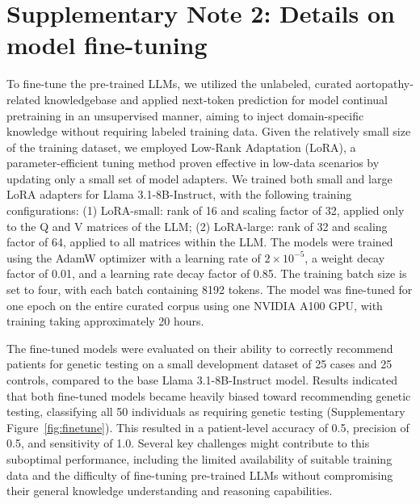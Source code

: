 \documentclass[fleqn,10pt]{wlscirep}
\begin{document}
\section*{Supplementary Note 2: Details on model fine-tuning}
To fine-tune the pre-trained LLMs, we utilized the unlabeled, curated aortopathy-related knowledgebase and applied next-token prediction for model continual pretraining in an unsupervised manner, aiming to inject domain-specific knowledge without requiring labeled training data. Given the relatively small size of the training dataset, we employed Low-Rank Adaptation (LoRA), a parameter-efficient tuning method proven effective in low-data scenarios by updating only a small set of model adapters. We trained both small and large LoRA adapters for Llama 3.1-8B-Instruct, with the following training configurations: (1) LoRA-small: rank of 16 and scaling factor of 32, applied only to the Q and V matrices of the LLM; (2) LoRA-large: rank of 32 and scaling factor of 64, applied to all matrices within the LLM. The models were trained using the AdamW optimizer with a learning rate of $2\times10^{-5}$, a weight decay factor of 0.01, and a learning rate decay factor of 0.85. The training batch size is set to four, with each batch containing 8192 tokens. The model was fine-tuned for one epoch on the entire curated corpus using one NVIDIA A100 GPU, with training taking approximately 20 hours.

The fine-tuned models were evaluated on their ability to correctly recommend patients for genetic testing on a small development dataset of 25 cases and 25 controls, compared to the base Llama 3.1-8B-Instruct model. Results indicated that both fine-tuned models became heavily biased toward recommending genetic testing, classifying all 50 individuals as requiring genetic testing (Supplementary Figure~\ref{fig:finetune}). This resulted in a patient-level accuracy of 0.5, precision of 0.5, and sensitivity of 1.0. Several key challenges might contribute to this suboptimal performance, including the limited availability of suitable training data and the difficulty of fine-tuning pre-trained LLMs without compromising their general knowledge understanding and reasoning capabilities.
\end{document}
